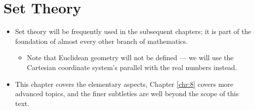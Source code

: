 \documentclass[../main.tex]{subfiles}
\begin{document}
\chapter{Set Theory}
\begin{itemize}
    \item {}Set theory will be frequently used in the subsequent chapters; it is part of the foundation of almost every other branch of mathematics.
    \begin{itemize}
        \item Note that Euclidean geometry will not be defined --- we will use the Cartesian coordinate system's parallel with the real numbers instead.
    \end{itemize}
    \item This chapter covers the elementary aspects, Chapter \ref{chr:8} covers more advanced topics, and the finer subtleties are well beyond the scope of this text.
\end{itemize}
\end{document}
